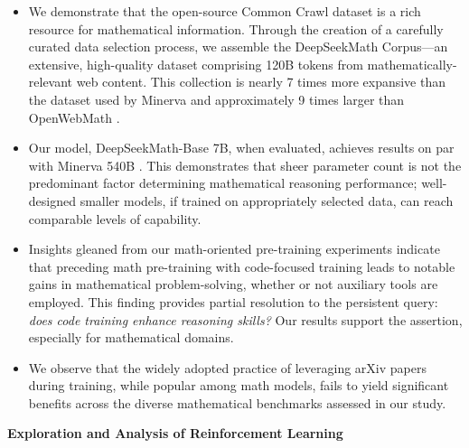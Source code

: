 \begin{itemize}[topsep=0pt]
    \item We demonstrate that the open-source Common Crawl dataset is a rich resource for mathematical information. Through the creation of a carefully curated data selection process, we assemble the DeepSeekMath Corpus—an extensive, high-quality dataset comprising 120B tokens from mathematically-relevant web content. This collection is nearly 7 times more expansive than the dataset used by Minerva \citep{minerva} and approximately 9 times larger than OpenWebMath \citep{openwebmath}.

    \item Our model, DeepSeekMath-Base 7B, when evaluated, achieves results on par with Minerva 540B \citep{minerva}. This demonstrates that sheer parameter count is not the predominant factor determining mathematical reasoning performance; well-designed smaller models, if trained on appropriately selected data, can reach comparable levels of capability.

    \item Insights gleaned from our math-oriented pre-training experiments indicate that preceding math pre-training with code-focused training leads to notable gains in mathematical problem-solving, whether or not auxiliary tools are employed. This finding provides partial resolution to the persistent query: \textit{does code training enhance reasoning skills?} Our results support the assertion, especially for mathematical domains.

    \item We observe that the widely adopted practice of leveraging arXiv papers during training, while popular among math models, fails to yield significant benefits across the diverse mathematical benchmarks assessed in our study.
\end{itemize}

\textbf{Exploration and Analysis of Reinforcement Learning}

